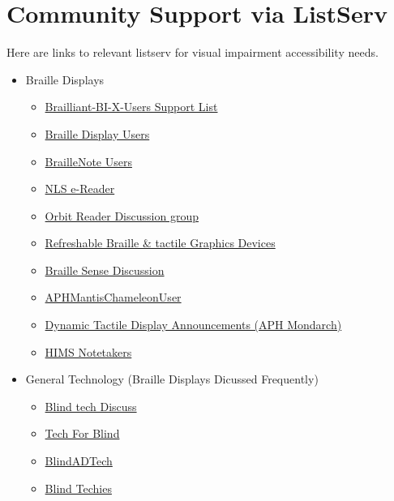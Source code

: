 \documentclass[12pt,letterpaper,twoside]{extreport}
\begin{document}
\begin{appendices}
\hypertarget{listserv2}{}\section{Community Support via ListServ}\label{listserv2}
Here are links to relevant listserv for visual impairment accessibility needs.
\begin{itemize}[leftmargin=*]
\item Braille Displays
\begin{itemize}[leftmargin=2em]
\item \href{https://groups.io/g/Brailliant-BI-X-USERS/}{Brailliant-BI-X-Users Support List} 
\item \href{https://groups.io/g/braille-display-users}{Braille Display Users}
\item \href{https://groups.io/g/braillenote}{BrailleNote Users}
\item \href{https://groups.io/g/nlsEReader/messages}{NLS e-Reader}
\item \href{https://groups.io/g/orbit-reader}{Orbit Reader Discussion group}
\item \href{https://www.freelists.org/list/braillecell}{Refreshable Braille \& tactile Graphics Devices}
\item \href{https://www.freelists.org/list/braille-sense}{Braille Sense Discussion}
\item \href{https://www.freelists.org/list/aphmantischameleonuser}{APHMantisChameleonUser}
\item \href{https://www.freelists.org/list/aph_dynamictactiledisplay_announce}{Dynamic Tactile Display Announcements (APH Mondarch)}
\item \href{https://groups.io/g/hims-notetakers-chat}{HIMS Notetakers}
\end{itemize}
\item General Technology (Braille Displays Dicussed Frequently)
\begin{itemize}[leftmargin=2em]
\item \href{https://groups.io/g/blindtechdiscuss/messages}{Blind tech Discuss}
\item \href{https://groups.io/g/tech-for-blind}{Tech For Blind}
\item \href{https://groups.io/g/blindadtech}{BlindADTech}
\item \href{https://groups.io/g/blind-techies/messages}{Blind Techies}
\end{itemize}
\end{itemize}
\end{appendices}
\end{document}
